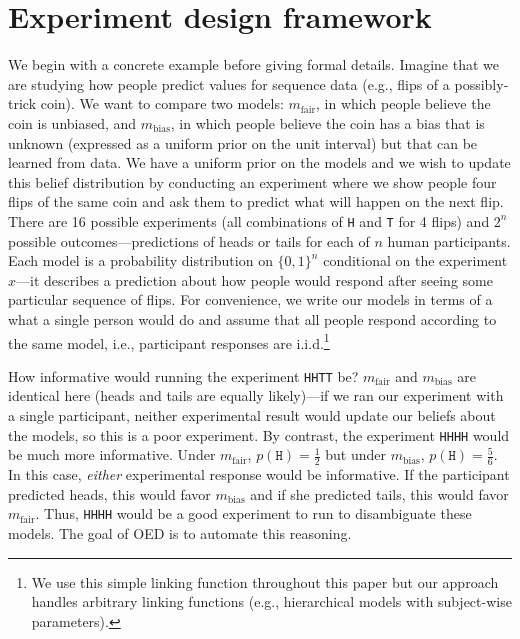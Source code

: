 \documentclass{article}
\begin{document}
\section{Experiment design framework}
\label{s:bayes}
We begin with a concrete example before giving formal details.
Imagine that we are studying how people predict values for sequence data (e.g., flips of a possibly-trick coin).
We want to compare two models: $m_{\text{fair}}$, in which people believe the coin is unbiased, and $m_{\text{bias}}$, in which people believe the coin has a bias that is unknown (expressed as a uniform prior on the unit interval) but that can be learned from data.
We have a uniform prior on the models and we wish to update this belief distribution by conducting an experiment where we show people four flips of the same coin and ask them to predict what will happen on the next flip.
There are 16 possible experiments (all combinations of \lstinline{H} and \lstinline{T} for 4 flips) and $2^n$ possible outcomes---predictions of heads or tails for each of $n$ human participants.
Each model is a probability distribution on $\{0,1\}^n$ conditional on the experiment $x$---it describes a prediction about how people would respond after seeing some particular sequence of flips.
For convenience, we write our models in terms of a what a single person would do and assume that all people respond according to the same model, i.e., participant responses are i.i.d.\footnote{We use this simple linking function throughout this paper but our approach handles arbitrary linking functions (e.g., hierarchical models with subject-wise parameters).}

How informative would running the experiment \lstinline{HHTT} be?
$m_{\text{fair}}$ and $m_{\text{bias}}$ are identical here (heads and tails are equally likely)---if we ran our experiment with a single participant, neither experimental result would update our beliefs about the models, so this is a poor experiment.
By contrast, the experiment \lstinline{HHHH} would be much more informative.
Under $m_{\text{fair}}$, $p(\texttt{H}) = \frac{1}{2}$ but under $m_{\text{bias}}$, $p(\texttt{H}) = \frac{5}{6}$.
In this case, \emph{either} experimental response would be informative.
If the participant predicted heads, this would favor $m_{\text{bias}}$ and if she predicted tails, this would favor $m_{\text{fair}}$.
Thus, \lstinline{HHHH} would be a good experiment to run to disambiguate these models.
The goal of OED is to automate this reasoning.
\end{document}

